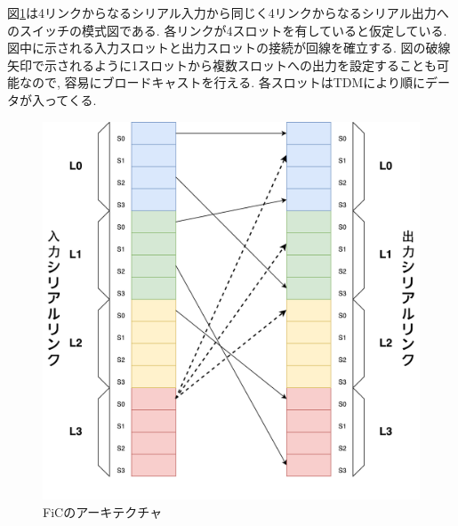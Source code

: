 {  図\ref{fig:arch-sw}は4リンクからなるシリアル入力から同じく4リンクからなるシリアル出力へのスイッチの模式図である.
  各リンクが4スロットを有していると仮定している.図中に示される入力スロットと出力スロットの接続が回線を確立する.
  図の破線矢印で示されるように1スロットから複数スロットへの出力を設定することも可能なので,
  容易にブロードキャストを行える.
  各スロットはTDMにより順にデータが入ってくる.
  
   \begin{figure}[h]
     \centering
     \includegraphics[width=12cm]{./chap3/fig/arch_sw.pdf}
     \caption{FiCのアーキテクチャ}
     \label{fig:arch-sw}
   \end{figure}
  
}
